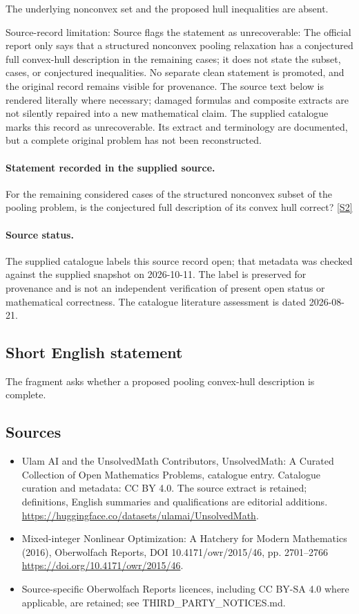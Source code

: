 \documentclass[11pt]{article}
\begin{document}
The underlying nonconvex set and the proposed hull inequalities are absent.

Source-record limitation: Source flags the statement as unrecoverable: The official report only says that a structured nonconvex pooling relaxation has a conjectured full convex-hull description in the remaining cases; it does not state the subset, cases, or conjectured inequalities. No separate clean statement is promoted, and the original record remains visible for provenance.
The source text below is rendered literally where necessary; damaged formulas and composite extracts are not silently repaired into a new mathematical claim.
The supplied catalogue marks this record as unrecoverable. Its extract and terminology are documented, but a complete original problem has not been reconstructed.
\paragraph{Statement recorded in the supplied source.}
For the remaining considered cases of the structured nonconvex subset of the pooling problem, is the conjectured full description of its convex hull correct? \href{https://doi.org/10.4171/owr/2015/46}{[S2]}
\paragraph{Source status.}
The supplied catalogue labels this source record open; that metadata was checked against the supplied snapshot on 2026-10-11. The label is preserved for provenance and is not an independent verification of present open status or mathematical correctness. The catalogue literature assessment is dated 2026-08-21.
\subsection{Short English statement}
The fragment asks whether a proposed pooling convex-hull description is complete.
\subsection{Sources}
\begin{itemize}
\item[S1] Ulam AI and the UnsolvedMath Contributors, UnsolvedMath: A Curated Collection of Open Mathematics Problems, catalogue entry. Catalogue curation and metadata: CC BY 4.0. The source extract is retained; definitions, English summaries and qualifications are editorial additions.
\url{https://huggingface.co/datasets/ulamai/UnsolvedMath}.
\item[S2] Mixed-integer Nonlinear Optimization: A Hatchery for Modern Mathematics (2016), Oberwolfach Reports, DOI 10.4171/owr/2015/46, pp. 2701--2766
\url{https://doi.org/10.4171/owr/2015/46}.
\item Source-specific Oberwolfach Reports licences, including CC BY-SA 4.0 where applicable, are retained; see THIRD\_PARTY\_NOTICES.md.
\end{itemize}
\end{document}
